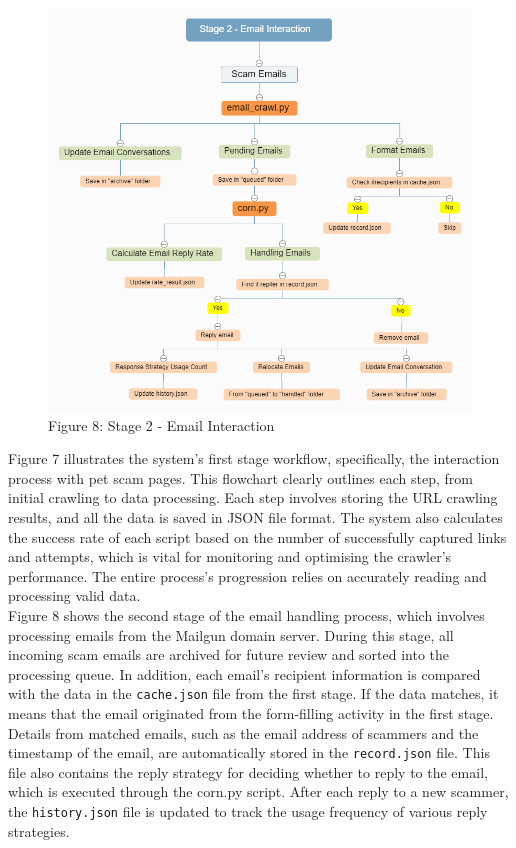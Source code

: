 \documentclass[ oneside,%
                    author={Cassie Qing Tang},
                    degree={BSc},
                     title={An Automated Response System for Disrupting Online Pet Scamming \\ },
                    subtitle={ }]{dissertation}
\begin{document}
\begin{figure}[H]\ContinuedFloat
\centering
\includegraphics[width=0.8\linewidth]{pic/figure8.png}
\caption{Figure 8: Stage 2 - Email Interaction}
\label{fig:pic8}
\end{figure}

Figure 7 illustrates the system's first stage workflow, specifically, the interaction process with pet scam pages. This flowchart clearly outlines each step, from initial crawling to data processing. Each step involves storing the URL crawling results, and all the data is saved in JSON file format. The system also calculates the success rate of each script based on the number of successfully captured links and attempts, which is vital for monitoring and optimising the crawler's performance. The entire process's progression relies on accurately reading and processing valid data.
\\

Figure 8 shows the second stage of the email handling process, which involves processing emails from the Mailgun domain server. During this stage, all incoming scam emails are archived for future review and sorted into the processing queue. In addition, each email's recipient information is compared with the data in the \texttt{cache.json} file from the first stage. If the data matches, it means that the email originated from the form-filling activity in the first stage. Details from matched emails, such as the email address of scammers and the timestamp of the email, are automatically stored in the \texttt{record.json} file. This file also contains the reply strategy for deciding whether to reply to the email, which is executed through the corn.py script. After each reply to a new scammer, the \texttt{history.json} file is updated to track the usage frequency of various reply strategies.
\\
\end{document}
